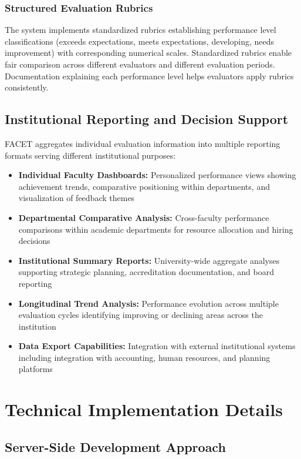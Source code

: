\documentclass[conference]{IEEEtran}
\begin{document}
\subsubsection{Structured Evaluation Rubrics}
The system implements standardized rubrics establishing performance level classifications (exceeds expectations, meets expectations, developing, needs improvement) with corresponding numerical scales. Standardized rubrics enable fair comparison across different evaluators and different evaluation periods. Documentation explaining each performance level helps evaluators apply rubrics consistently.

\subsection{Institutional Reporting and Decision Support}
\label{subsec:reporting}

FACET aggregates individual evaluation information into multiple reporting formats serving different institutional purposes:

\begin{itemize}
\item \textbf{Individual Faculty Dashboards:} Personalized performance views showing achievement trends, comparative positioning within departments, and visualization of feedback themes
\item \textbf{Departmental Comparative Analysis:} Cross-faculty performance comparisons within academic departments for resource allocation and hiring decisions
\item \textbf{Institutional Summary Reports:} University-wide aggregate analyses supporting strategic planning, accreditation documentation, and board reporting
\item \textbf{Longitudinal Trend Analysis:} Performance evolution across multiple evaluation cycles identifying improving or declining areas across the institution
\item \textbf{Data Export Capabilities:} Integration with external institutional systems including integration with accounting, human resources, and planning platforms
\end{itemize}

\section{Technical Implementation Details}
\label{sec:implementation}

\subsection{Server-Side Development Approach}
\label{subsec:backend}
\end{document}

